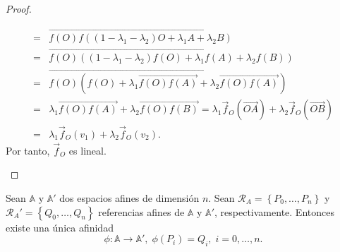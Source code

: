 \begin{proof}
\begin{description}
\[\begin{split}
		= &  \overrightarrow{f\left(O\right)f\left(\left(1-\lambda_{1}-\lambda_{2}\right)O + \lambda_{1}A + \lambda_{2}B\right)} \\
		= & \overrightarrow{f\left(O\right)\left(\left(1-\lambda_{1}-\lambda_{2}\right)f\left(O\right) + \lambda_{1}f\left(A\right) + \lambda_{2}f\left(B\right)\right)} \\
		= & \overrightarrow{f\left(O\right)\left(f\left(O\right) + \lambda_{1}\overrightarrow{f\left(O\right)f\left(A\right)}+\lambda_{2}\overrightarrow{f\left(O\right)f\left(A\right)}\right)} \\
		= & \lambda_{1}\overrightarrow{f\left(O\right)f\left(A\right)} + \lambda_{2}\overrightarrow{f\left(O\right)f\left(B\right)} = \lambda_{1}\vec{f}_{O}\left(\overrightarrow{OA}\right) + \lambda_{2}\vec{f}_{O}\left(\overrightarrow{OB}\right) \\
		= & \lambda_{1}\vec{f}_{O}\left(v_{1}\right) + \lambda_{2}\vec{f}_{O}\left(v_{2}\right).
	\end{split}
	\]
	Por tanto, $\displaystyle \vec{f}_{O} $ es lineal.
\end{description}
\end{proof}
\begin{prop}
	Sean $\displaystyle \mathbb{A} $ y $\displaystyle \mathbb{A}' $ dos espacios afines de dimensión $\displaystyle n $. Sean $\displaystyle \mathcal{R}_{A} = \left\{ P_{0}, \ldots, P_{n}\right\}  $ y $\displaystyle \mathcal{R}_{A}' = \left\{ Q_{0}, \ldots, Q_{n}\right\}  $ referencias afines de $\displaystyle \mathbb{A} $ y $\displaystyle \mathbb{A}' $, respectivamente. Entonces existe una única afinidad
	\[\phi : \mathbb{A} \to \mathbb{A}', \; \phi\left(P_{i}\right) = Q_{i}, \; i = 0, \ldots, n .\]
\end{prop}
